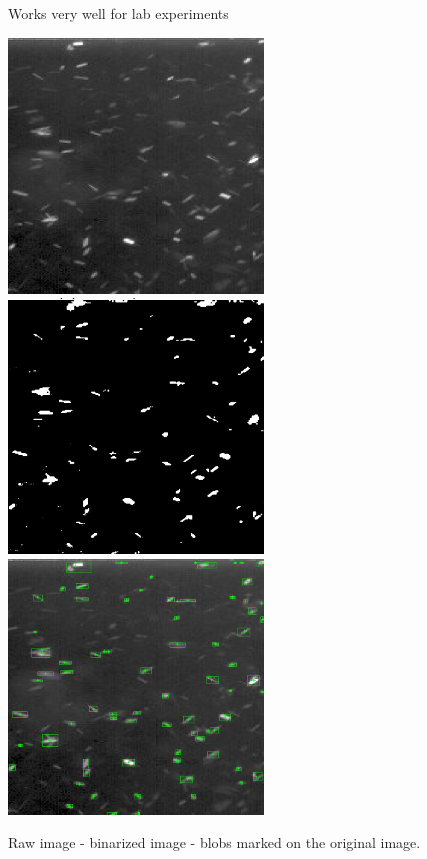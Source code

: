 \documentclass[aspectratio=43]{beamer}
\begin{document}
\begin{frame}{Works very well for lab experiments}
\begin{card}
\centering
\includegraphics[width=.32\textwidth]{1_in}
\includegraphics[width=.32\textwidth]{1_binarized}
\includegraphics[width=.32\textwidth]{1_out}
\end{card}
\vspace{-.5cm}
\begin{cardTiny}
Raw image - binarized image - blobs marked on the original image.  
\end{cardTiny}
\end{frame}
\end{document}
